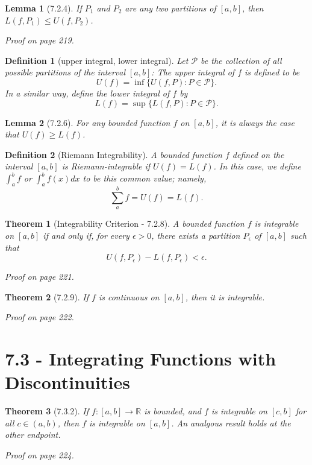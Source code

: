 \documentclass{article}
\newtheorem{definition}{Definition}
\newtheorem{theorem}{Theorem}
\newtheorem{lemma}{Lemma}
\begin{document}
\begin{lemma}[7.2.4]
    If $P_1$ and $P_2$ are any two partitions of $[a,b]$, then $L(f,P_1) \leq U(f, P_2)$.

    Proof on page 219.
\end{lemma}

\begin{definition}[upper integral, lower integral]
    Let $\mathcal{P}$ be the collection of all possible partitions of the interval $[a,b]$: The \textit{upper integral} of $f$ is defined to be \[U(f)=\inf \{U(f,P):P \in \mathcal{P}\}.\]
    In a similar way, define the \textit{lower integral} of $f$ by \[L(f) = \sup \{L(f,P):P \in \mathcal{P}\}.\]
\end{definition}

\begin{lemma}[7.2.6]
    For any bounded function $f$ on $[a,b]$, it is always the case that $U(f) \geq L(f)$.
\end{lemma}

\begin{definition}[Riemann Integrability]
    A bounded function $f$ defined on the interval $[a,b]$ is \textit{Riemann-integrable} if $U(f)=L(f)$. In this case, we define $\int _a^b f$ or $\int _a^b f(x)dx$ to be this common value; namely, \[\sum _a^b f = U(f) = L(f).\]
\end{definition}

\begin{theorem}[Integrability Criterion - 7.2.8]
    A bounded function $f$ is integrable on $[a,b]$ if and only if, for every $\epsilon > 0$, there exists a partition $P_\epsilon$ of $[a,b]$ such that \[U(f,P_\epsilon) - L(f, P_\epsilon) < \epsilon .\]

    Proof on page 221.
\end{theorem}

\begin{theorem}[7.2.9]
    If $f$ is continuous on $[a,b]$, then it is integrable.

    Proof on page 222.
\end{theorem}

\section*{7.3 - Integrating Functions with Discontinuities}
\begin{theorem}[7.3.2]
    If $f:[a,b] \rightarrow \mathbb{R}$ is bounded, and $f$ is integrable on $[c,b]$ for all $c \in (a,b)$, then $f$ is integrable on $[a,b]$. An analgous result holds at the other endpoint.

    Proof on page 224.
\end{theorem}
\end{document}
